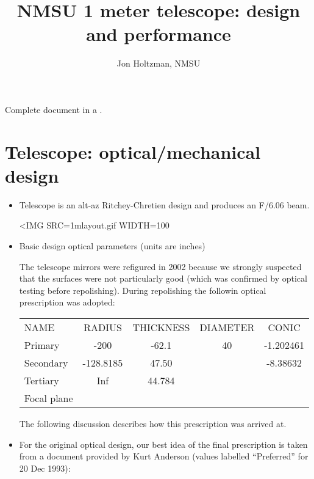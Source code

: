 \documentclass{article}[12pt]
\title{NMSU 1 meter telescope: design and performance}
\author{Jon Holtzman, NMSU}
\begin{document}
\maketitle

\vskip 0.5in

Complete document in a 
.

\section{Telescope: optical/mechanical design}

\begin{itemize}
\item Telescope is an alt-az Ritchey-Chretien design and produces an F/6.06 
beam.

\begin{latexonly}
\end{latexonly}
\begin{htmlonly}
\begin{rawhtml}
<IMG SRC=1mlayout.gif WIDTH=100%
\end{rawhtml}
\end{htmlonly}

\item Basic design optical parameters (units are inches)

The telescope mirrors were refigured in 2002 because we strongly suspected that
the surfaces were not particularly good (which was confirmed by optical
testing before repolishing). During repolishing the followin optical 
prescription was adopted:

\begin{center}
\begin{tabular}{lcccc}
NAME & RADIUS & THICKNESS & DIAMETER & CONIC \\
Primary & -200 & -62.1 & 40 & -1.202461 \\
Secondary & -128.8185 & 47.50 & & -8.38632 \\
Tertiary & Inf & 44.784 & & \\
Focal plane & & & 
\end{tabular}
\end{center}

The following discussion describes how this prescription was arrived at.

\item For the original optical design, our best idea of the final prescription
is taken from a document provided by Kurt Anderson (values labelled
``Preferred'' for 20 Dec 1993):


\end{itemize}
\end{document}
